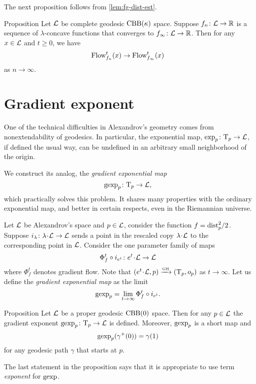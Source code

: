 The next proposition follows from \ref{lem:fg-dist-est}.

\begin{thm}{Proposition}\label{grad-curve-conv}
Let $\mathcal{L}$ be complete geodesic $\mathrm{CBB}(\kappa)$ space.
Suppose $f_n\colon\mathcal{L}\to\mathbb{R}$ is a sequence of
$\lambda$-concave functions 
that converges to $f_\infty\colon\mathcal{L}\to \mathbb{R}$. 
Then for any $x\in \mathcal{L}$ and $t\ge 0$, we have
\[\mathop{\rm Flow}\nolimits_{f_n}^t(x)\to \mathop{\rm Flow}\nolimits_{f_\infty}^t(x)\]
as $n\to \infty$.
\end{thm}


\section{Gradient exponent}\label{gexp}

One of the technical difficulties in Alexandrov's geometry comes from
nonextendability of geodesics. 
In particular, the exponential map, $\exp_p\colon\mathrm{T}_p\to \mathcal{L}$, if defined the usual way, can
be undefined in an arbitrary small neighborhood of the origin. 

We construct its analog, the \emph{gradient exponential map} 
\[\operatorname{\rm gexp}\nolimits_p\colon\mathrm{T}_p\to\mathcal{L},\]
which practically solves this problem. 
It shares many properties with the ordinary exponential map, and better in certain respects,
even in the Riemannian universe.

Let $\mathcal{L}$ be Alexandrov's space and $p\in \mathcal{L}$, consider the function $f\z=\distfun_p^2/2$.
Suppose $i_{\lambda}\:\lambda\cdot \spc{L}\to \spc{L}$ sends a point in the rescaled copy $\lambda\cdot\spc{L}$ to the corresponding point in $\mathcal{L}$.
Consider the one parameter family of maps
$$\Phi^t_{f}\circ i_{e^t}\:e^t{\cdot} \spc{L}\to \spc{L}$$
where $\Phi^t_{f}$ denotes gradient flow. 
Note that $(e^t{\cdot} \spc{L},p)\GHto (\T_p,o_p)$ as $t\to\infty$.
Let us define the \textit{gradient exponential map} as the limit
\[\operatorname{\rm gexp}\nolimits_p=\lim_{t\to\infty}\Phi^t_{f}\circ i_{e^t}.\]

\begin{thm}{Proposition}
Let $\mathcal{L}$ be a proper geodesic $\mathrm{CBB}(0)$ space.
Then for any $p\in \mathcal{L}$ the gradient exponent $\operatorname{\rm gexp}\nolimits_p\colon\mathrm{T}_p\to\mathcal{L}$ is defined.
Moreover, $\operatorname{\rm gexp}\nolimits_p$ is a short map and 
\[\operatorname{\rm gexp}\nolimits_p(\gamma^+(0))=\gamma(1)\]
for any geodesic path $\gamma$ that starts at $p$.
\end{thm}

The last statement in the proposition says that it is appropriate to use term \textit{exponent} for $\operatorname{\rm gexp}\nolimits$.


